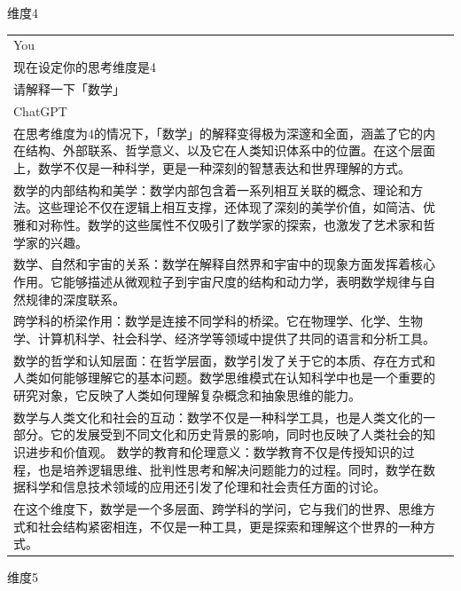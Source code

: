 \documentclass[12pt]{book}
\begin{document}
\bigskip
维度4

\begin{tabular}{|p{15cm}|p{3cm}|}
	\hline
You\\
现在设定你的思考维度是4\\

请解释一下「数学」\\
ChatGPT\\
在思考维度为4的情况下，「数学」的解释变得极为深邃和全面，涵盖了它的内在结构、外部联系、哲学意义、以及它在人类知识体系中的位置。在这个层面上，数学不仅是一种科学，更是一种深刻的智慧表达和世界理解的方式。\\
数学的内部结构和美学：数学内部包含着一系列相互关联的概念、理论和方法。这些理论不仅在逻辑上相互支撑，还体现了深刻的美学价值，如简洁、优雅和对称性。数学的这些属性不仅吸引了数学家的探索，也激发了艺术家和哲学家的兴趣。\\
数学、自然和宇宙的关系：数学在解释自然界和宇宙中的现象方面发挥着核心作用。它能够描述从微观粒子到宇宙尺度的结构和动力学，表明数学规律与自然规律的深度联系。\\
跨学科的桥梁作用：数学是连接不同学科的桥梁。它在物理学、化学、生物学、计算机科学、社会科学、经济学等领域中提供了共同的语言和分析工具。\\
数学的哲学和认知层面：在哲学层面，数学引发了关于它的本质、存在方式和人类如何能够理解它的基本问题。数学思维模式在认知科学中也是一个重要的研究对象，它反映了人类如何理解复杂概念和抽象思维的能力。\\
数学与人类文化和社会的互动：数学不仅是一种科学工具，也是人类文化的一部分。它的发展受到不同文化和历史背景的影响，同时也反映了人类社会的知识进步和价值观。
数学的教育和伦理意义：数学教育不仅是传授知识的过程，也是培养逻辑思维、批判性思考和解决问题能力的过程。同时，数学在数据科学和信息技术领域的应用还引发了伦理和社会责任方面的讨论。\\
在这个维度下，数学是一个多层面、跨学科的学问，它与我们的世界、思维方式和社会结构紧密相连，不仅是一种工具，更是探索和理解这个世界的一种方式。\\
	\hline
\end{tabular}


\bigskip
维度5
\end{document}
